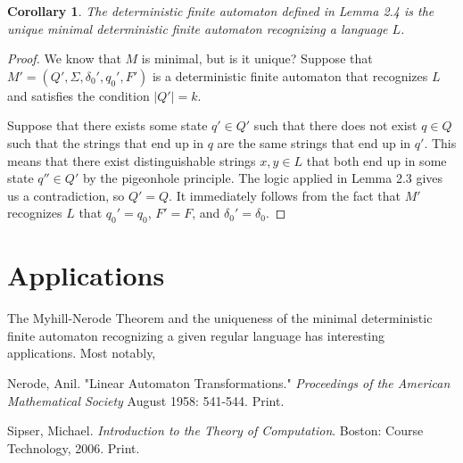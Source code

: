 \documentclass[12pt]{article}
\newtheorem{corollary}[theorem]{Corollary}
\theoremstyle{definition}
\theoremstyle{remark}
\begin{document}
\begin{corollary}
The deterministic finite automaton defined in Lemma 2.4 is the unique minimal deterministic finite automaton recognizing a language $L$.
\end{corollary}

\begin{proof}
We know that $M$ is minimal, but is it unique? Suppose that $M'=(Q',\Sigma,\delta_0',q_0',F')$ is a deterministic finite automaton that recognizes $L$ and satisfies the condition $|Q'| = k$.

Suppose that there exists some state $q' \in Q'$ such that there does not exist $q \in Q$ such that the strings that end up in $q$ are the same strings that end up in $q'$. This means that there exist distinguishable strings $x,y \in L$ that both end up in some state $q'' \in Q'$ by the pigeonhole principle. The logic applied
in Lemma 2.3 gives us a contradiction, so $Q'=Q$. It immediately follows from the fact that $M'$ recognizes $L$ that $q_0'=q_0$, $F'=F$, and $\delta_0'=\delta_0$.
\end{proof}

\section{Applications}

The Myhill-Nerode Theorem and the uniqueness of the minimal deterministic finite automaton recognizing a given regular language has interesting applications. Most notably, 



\begin{thebibliography}{9}

Nerode, Anil. "Linear Automaton Transformations." \textit{Proceedings of the American Mathematical Society} August 1958: 541-544. Print.

Sipser, Michael. \textit{Introduction to the Theory of Computation}. Boston: Course Technology, 2006. Print.

\end{thebibliography}
\end{document}
